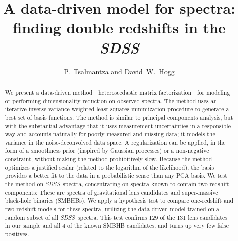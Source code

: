 \documentclass[apj]{emulateapj}
\newcommand{\project}[1]{\textsl{#1}}
\newcommand{\sdss}{\project{SDSS}}
\newcommand{\SDSS}{\sdss}
\begin{document}
\title{A data-driven model for spectra:\\
       finding double redshifts in the \SDSS}
\author{P.~Tsalmantza and David~W.~Hogg}

\begin{abstract}
We present a data-driven method---heteroscedastic matrix
factorization---for modeling or performing dimensionality reduction on
observed spectra.  The method uses an iterative
inverse-variance-weighted least-squares minimization procedure to
generate a best set of basis functions.  The method is similar to
principal components analysis, but with the substantial advantage that
it uses measurement uncertainties in a responsible way and accounts
naturally for poorly measured and missing data; it models the variance
in the noise-deconvolved data space.  A regularization can be applied,
in the form of a smoothness prior (inspired by Gaussian processes) or
a non-negative constraint, without making the method prohibitively
slow.  Because the method optimizes a justified scalar (related to the
logarithm of the likelihood), the basis provides a better fit to the
data in a probabilistic sense than any PCA basis.  We test the method
on \SDSS\ spectra, concentrating on spectra known to contain two
redshift components: These are spectra of gravitational lens
candidates and super-massive black-hole binaries (SMBHBs). We apply a
hypothesis test to compare one-redshift and two-redshift models for
these spectra, utilizing the data-driven model trained on a random
subset of all \SDSS\ spectra.  This test confirms 129 of the 131 lens
candidates in our sample and all 4 of the known SMBHB candidates, and
turns up very few false positives.
\end{abstract}

\end{document}
